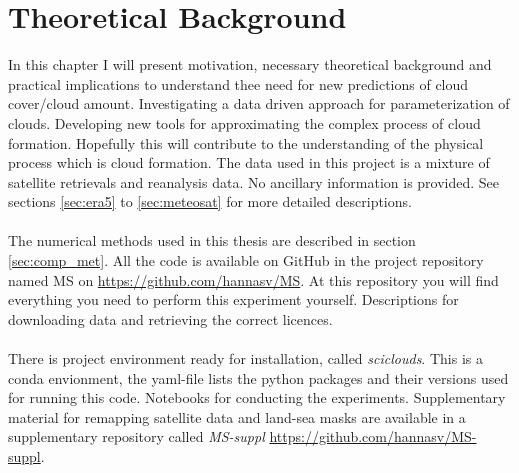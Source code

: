 \setcounter{chapter}{1} 
\chapter{Theoretical Background} \label{ch:theoretical_back}
In this chapter I will present motivation, necessary theoretical background and practical implications to understand thee need for new predictions of cloud cover/cloud amount. Investigating a data driven approach for parameterization of clouds. Developing new tools for approximating the complex process of cloud formation. Hopefully this will contribute to the understanding of the physical process which is cloud formation. The data used in this project is a mixture of satellite retrievals and reanalysis data. No ancillary information is provided. See sections \ref{sec:era5} to \ref{sec:meteosat} for more detailed descriptions. 
\\ \\
The numerical methods used in this thesis are described in section \ref{sec:comp_met}. All the code is available on GitHub in the project repository named MS on \href{https://github.com/hannasv/MS}{https://github.com/hannasv/MS}. At this repository you will find everything you need to perform this experiment yourself. Descriptions for downloading data and retrieving the correct licences. 
\\ \\ 
There is project environment ready for installation, called \textit{sciclouds}. This is a conda envionment, the yaml-file lists the python packages and their versions used for running this code. Notebooks for conducting the experiments. Supplementary material for remapping satellite data and land-sea masks are available in a supplementary repository called \textit{MS-suppl} \href{https://github.com/hannasv/MS-suppl}{https://github.com/hannasv/MS-suppl}.

